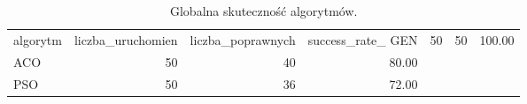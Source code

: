 \begin{table}
\caption{Globalna skuteczność algorytmów.}
\label{tab:success_rate}
\begin{tabular}{lrrr}
\toprule
algorytm & liczba_uruchomien & liczba_poprawnych & success_rate_%
\midrule
GEN & 50 & 50 & 100.00 \\
ACO & 50 & 40 & 80.00 \\
PSO & 50 & 36 & 72.00 \\
\bottomrule
\end{tabular}
\end{table}
